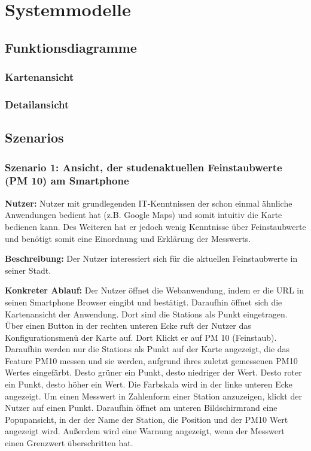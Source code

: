 \section{Systemmodelle}

\subsection{Funktionsdiagramme}

\subsubsection{Kartenansicht}
\noindent{}

\subsubsection{Detailansicht}
\noindent{}

\subsection{Szenarios}

\subsubsection{Szenario 1: Ansicht, der studenaktuellen Feinstaubwerte (PM 10) am Smartphone}
\textbf{Nutzer:} Nutzer mit grundlegenden IT-Kenntnissen der schon einmal ähnliche Anwendungen bedient hat (z.B. Google Maps) 
und somit intuitiv die Karte bedienen kann. Des Weiteren hat er jedoch wenig Kenntnisse über Feinstaubwerte und benötigt somit 
eine Einordnung und Erklärung der \glspl{Messwert}.

\textbf{Beschreibung:} Der Nutzer interessiert sich für die aktuellen Feinstaubwerte in seiner Stadt.

\textbf{Konkreter Ablauf:}
Der Nutzer öffnet die \gls{Webanwendung}, indem er die URL in seinen Smartphone Browser eingibt und bestätigt. Daraufhin öffnet 
sich die Kartenansicht der Anwendung. Dort sind die \glspl{Station} als Punkt eingetragen. Über einen Button in der rechten unteren 
Ecke ruft der Nutzer das Konfigurationsmenü der Karte auf. Dort Klickt er auf PM 10 (Feinstaub). Daraufhin werden nur die 
\glspl{Station} als Punkt auf der Karte angezeigt, die das \gls{Feature} PM10 messen und sie werden, aufgrund ihres zuletzt 
gemessenen PM10 Wertes eingefärbt. Desto grüner ein Punkt, desto niedriger der Wert. Desto roter ein Punkt, desto höher ein Wert. 
Die Farbskala wird in der linke unteren Ecke angezeigt.
Um einen \gls{Messwert} in Zahlenform einer \gls{Station} anzuzeigen, klickt der Nutzer auf einen Punkt. Daraufhin öffnet am 
unteren Bildschirmrand eine Popupansicht, in der der Name der \gls{Station}, die Position und der PM10 Wert angezeigt wird. 
Außerdem wird eine Warnung angezeigt, wenn der \gls{Messwert} einen Grenzwert überschritten hat.


